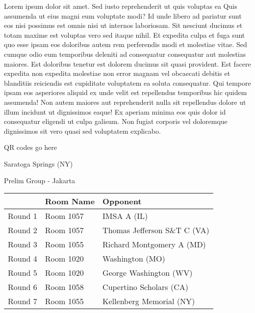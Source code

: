 \documentclass{article}%
\begin{document}
\vspace*{8pt}%
\linebreak%
\newline%
\newline%
Lorem ipsum dolor sit amet. Sed iusto reprehenderit ut quis voluptas ea Quis assumenda ut eius magni eum voluptate modi? Id unde libero ad pariatur sunt eos nisi possimus est omnis nisi ut internos laboriosam. Sit nesciunt ducimus et totam maxime est voluptas vero sed itaque nihil. Et expedita culpa et fuga sunt quo esse ipsam eos doloribus autem rem perferendis modi et molestiae vitae.\newline%
\newline%
Sed cumque odio eum temporibus deleniti ad consequatur consequatur aut molestias maiores. Est doloribus tenetur est dolorem ducimus sit quasi provident. Est facere expedita non expedita molestiae non error magnam vel obcaecati debitis et blanditiis reiciendis est cupiditate voluptatem ea soluta consequatur. Qui tempore ipsam eos asperiores aliquid ex unde velit est repellendus temporibus hic quidem assumenda!\newline%
\newline%
Non autem maiores aut reprehenderit nulla sit repellendus dolore ut illum incidunt ut dignissimos eaque! Ex aperiam minima eos quis dolor id consequatur eligendi ut culpa galisum. Non fugiat corporis vel doloremque dignissimos sit vero quasi sed voluptatem explicabo.\newline%
\newline%
%
\vspace*{30pt}%
\begin{center}%
\begin{Huge}%
QR codes go here%
\end{Huge}%
\end{center}%
\newpage%
%
\begin{center}%
\begin{Huge}%
Saratoga Springs (NY)%
\end{Huge}%
\vspace*{8pt}%
\linebreak%
\begin{Large}%
Prelim Group {-} Jakarta%
\end{Large}%
\end{center}%
\begin{tabularx}{\textwidth}{|c|Y|Y|}%
\hline%
&Room Name&Opponent\\%
\hline%
Round 1&Room 1057&IMSA A (IL)\\%
Round 2&Room 1057&Thomas Jefferson S\&T C (VA)\\%
Round 3&Room 1055&Richard Montgomery A (MD)\\%
Round 4&Room 1020&Washington (MO)\\%
Round 5&Room 1020&George Washington (WV)\\%
Round 6&Room 1058&Cupertino Scholars (CA)\\%
Round 7&Room 1055&Kellenberg Memorial (NY)\\%
\hline%
\end{tabularx}%
\end{document}
